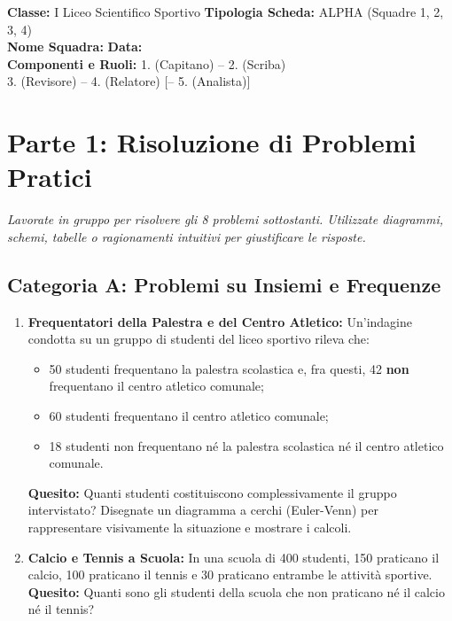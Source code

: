 \documentclass[11pt, a4paper]{article}
\begin{document}

\begin{tcolorbox}[colframe=primary, title=\Large\bfseries SFIDA A SQUADRE: DAI PROBLEMI AGLI INSIEMI -- SQUADRA ALPHA]
\small
\textbf{Classe:} I Liceo Scientifico Sportivo \hfill \textbf{Tipologia Scheda:} ALPHA (Squadre 1, 2, 3, 4) \\
\textbf{Nome Squadra:} \dotfill \hfill \textbf{Data:} \dotfill \\
\textbf{Componenti e Ruoli:} 1. \dotfill (Capitano) -- 2. \dotfill (Scriba) \\
3. \dotfill (Revisore) -- 4. \dotfill (Relatore) [-- 5. \dotfill (Analista)]
\end{tcolorbox}

\vspace{-2mm}
\section*{Parte 1: Risoluzione di Problemi Pratici}
\textit{Lavorate in gruppo per risolvere gli 8 problemi sottostanti. Utilizzate diagrammi, schemi, tabelle o ragionamenti intuitivi per giustificare le risposte.}

\subsection*{Categoria A: Problemi su Insiemi e Frequenze}
\begin{enumerate}
    \item \textbf{Frequentatori della Palestra e del Centro Atletico:} Un'indagine condotta su un gruppo di studenti del liceo sportivo rileva che:
    \begin{itemize}
        \item 50 studenti frequentano la palestra scolastica e, fra questi, 42 \textbf{non} frequentano il centro atletico comunale;
        \item 60 studenti frequentano il centro atletico comunale;
        \item 18 studenti non frequentano né la palestra scolastica né il centro atletico comunale.
    \end{itemize}
    \textbf{Quesito:} Quanti studenti costituiscono complessivamente il gruppo intervistato? Disegnate un diagramma a cerchi (Euler-Venn) per rappresentare visivamente la situazione e mostrare i calcoli.
    
    \vspace{1.5cm}

    \item \textbf{Calcio e Tennis a Scuola:} In una scuola di 400 studenti, 150 praticano il calcio, 100 praticano il tennis e 30 praticano entrambe le attività sportive.
    \textbf{Quesito:} Quanti sono gli studenti della scuola che non praticano né il calcio né il tennis?
    
    \vspace{1.2cm}
\end{enumerate}
\end{document}
